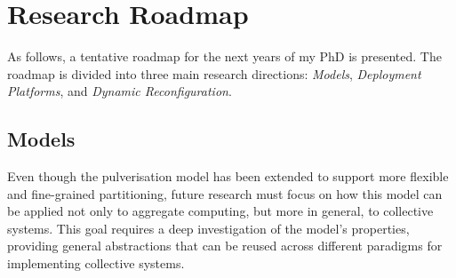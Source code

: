 \documentclass[runningheads]{llncs}
\begin{document}



\section{Research Roadmap}
\label{sec:future-directions}
As follows,
a tentative roadmap for the next years of my PhD is presented.
%
The roadmap is divided into three main research directions: \emph{Models},
\emph{Deployment Platforms},
and \emph{Dynamic Reconfiguration}.

\subsection{Models}
Even though the pulverisation model has been extended to support more flexible and fine-grained partitioning,
future research must focus on how this model can be applied not only to aggregate computing,
but more in general,
to collective systems.
%
This goal requires a deep investigation of the model's properties,
providing general abstractions that can be reused across different paradigms for implementing collective systems.
\end{document}
